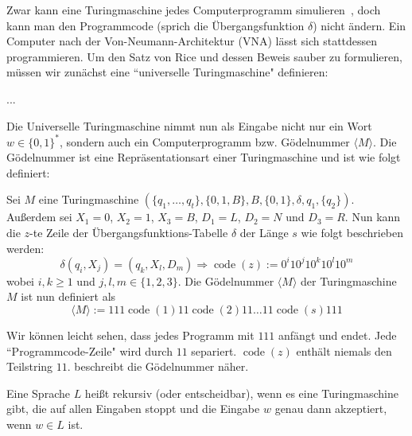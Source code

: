 \documentclass[journal]{IEEEtran}
\begin{document}
  Zwar kann eine Turingmaschine jedes Computerprogramm simulieren~\cite{Wegener2013:2.3}, doch kann man den Programmcode (sprich die Übergangsfunktion $\delta$) nicht ändern. Ein Computer nach der Von-Neumann-Architektur (VNA) lässt sich stattdessen programmieren. Um den Satz von Rice und dessen Beweis sauber zu formulieren, müssen wir zunächst eine ``universelle Turingmaschine" definieren:

  \begin{definition}
    ...
  \end{definition}

  Die Universelle Turingmaschine nimmt nun als Eingabe nicht nur ein Wort $w \in \{0, 1\}^*$, sondern auch ein Computerprogramm bzw. Gödelnummer $\langle M \rangle$. Die Gödelnummer ist eine Repräsentationsart einer Turingmaschine und ist wie folgt definiert:

  \begin{definition}[Gödelnummer]
    Sei $M$ eine Turingmaschine $(\{q_1, \dotsc, q_t\}, \{0, 1, B\}, B, \{0, 1\}, \delta, q_1, \{q_2\})$. Außerdem sei $X_1 = 0$, $X_2 = 1$, $X_3 = B$, $D_1 = L$, $D_2 = N$ und $D_3 = R$. Nun kann die $z$-te Zeile der Übergangsfunktions-Tabelle $\delta$ der Länge $s$ wie folgt beschrieben werden:
    \begin{equation*}
      \delta(q_i, X_j) = (q_k, X_l, D_m) \Longrightarrow \operatorname{code}(z) := 0^i 10^j 10^k 10^l 10^m
    \end{equation*}
    wobei $i, k \ge 1$ und $j, l, m \in \{1, 2, 3\}$. Die Gödelnummer $\langle M \rangle$ der Turingmaschine $M$ ist nun definiert als
    \begin{equation*}
      \langle M \rangle := 111 \operatorname{code}(1) 11 \operatorname{code}(2) 11 \dotsc 11 \operatorname{code}(s) 111
    \end{equation*}
  \end{definition}

  Wir können leicht sehen, dass jedes Programm mit $111$ anfängt und endet. Jede ``Programmcode-Zeile" wird durch $11$ separiert. $\operatorname{code}(z)$ enthält niemals den Teilstring $11$. \cite{Wegener2013:2.4} beschreibt die Gödelnummer näher.

  \begin{definition}[Entscheidbarkeit]
    Eine Sprache $L$ heißt rekursiv (oder entscheidbar), wenn es eine Turingmaschine gibt, die auf allen Eingaben stoppt und die Eingabe $w$ genau dann akzeptiert, wenn $w \in L$ ist.~\cite{Wegener2013:2.1.2}
  \end{definition}
\end{document}
